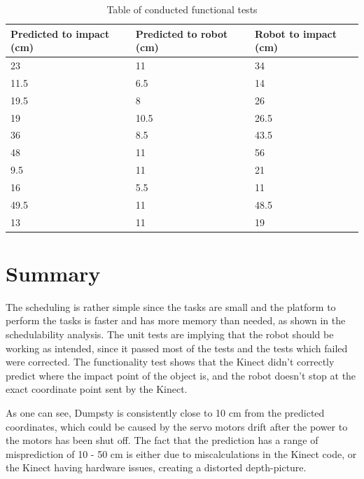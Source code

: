 \begin{table}[H]
	\begin{center}
		\begin{tabular}{ | p{5cm} | p{5cm} | p{5cm} |}
			\hline
			\textbf{Predicted to impact (cm)} & \textbf{Predicted to robot (cm)} & \textbf{Robot to impact (cm)} \\ \hline
			23 & 11 & 34 \\ \hline
			11.5 & 6.5 & 14 \\ \hline
			19.5 & 8 & 26 \\ \hline
			19 & 10.5 & 26.5 \\ \hline
			36 & 8.5 & 43.5 \\ \hline
			48 & 11 & 56 \\ \hline
			9.5 & 11 & 21 \\ \hline
			16 & 5.5 & 11 \\ \hline
			49.5 & 11 & 48.5 \\ \hline
			13 & 11 & 19 \\ \hline
			
		\end{tabular}
		\caption{Table of conducted functional tests}
		\label{table:FuncTest}
	\end{center}
\end{table}


\section{Summary}
\label{sec:summary}
The scheduling is rather simple since the tasks are small and the platform to perform the tasks is faster and has more memory than needed, as shown in the schedulability analysis. The unit tests are implying that the robot should be working as intended, since it passed most of the tests and the tests which failed were corrected. The functionality test shows that the Kinect didn’t correctly predict where the impact point of the object is, and the robot doesn’t stop at the exact coordinate point sent by the Kinect. 


As one can see, Dumpsty is consistently close to 10 cm from the predicted coordinates, which could be caused by the servo motors drift after the power to the motors has been shut off. The fact that the prediction has a range of misprediction of 10 - 50 cm is either due to miscalculations in the Kinect code, or the Kinect having hardware issues, creating a distorted depth-picture.






